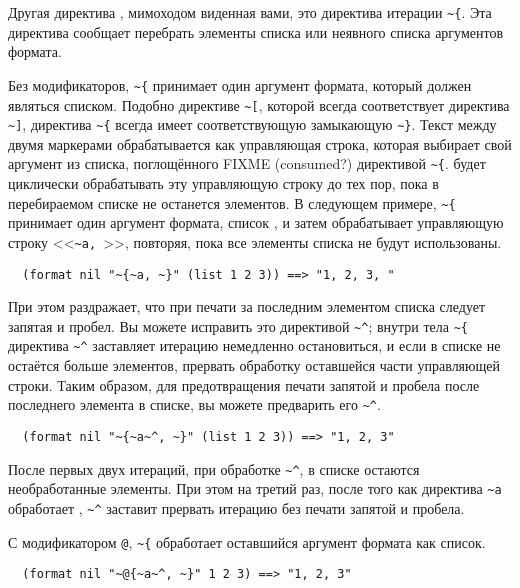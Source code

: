 Другая директива , мимоходом виденная вами, это директива итерации
\lstinline!~{!. Эта директива сообщает  перебрать элементы списка или
  неявного списка аргументов формата.

Без модификаторов, \lstinline!~{! принимает один аргумент формата, который должен являться списком. Подобно директиве
\lstinline!~[!, которой всегда соответствует директива \lstinline!~]!, директива \lstinline!~{! всегда имеет соответствующую замыкающую
\lstinline!~}!. Текст между двумя маркерами обрабатывается как управляющая строка, которая выбирает свой аргумент из
списка, поглощённого FIXME (consumed?)  директивой \lstinline!~{!.  будет циклически обрабатывать эту
управляющую строку до тех пор, пока в перебираемом списке не останется элементов. В следующем примере, \lstinline!~{!
принимает один аргумент формата, список , и затем обрабатывает управляющую строку <<\lstinline!~a, !>>, повторяя,
пока все элементы списка не будут использованы.

\begin{verbatim}
  (format nil "~{~a, ~}" (list 1 2 3)) ==> "1, 2, 3, "
\end{verbatim}

При этом раздражает, что при печати за последним элементом списка следует запятая и пробел. Вы можете исправить
это директивой \lstinline!~^!; внутри тела \lstinline!~{! директива \lstinline!~^! заставляет итерацию немедленно остановиться, и если в
списке не остаётся больше элементов, прервать обработку оставшейся части управляющей строки. Таким образом, для
предотвращения печати запятой и пробела после последнего элемента в списке, вы можете предварить его \lstinline!~^!.

\begin{verbatim}
  (format nil "~{~a~^, ~}" (list 1 2 3)) ==> "1, 2, 3"
\end{verbatim}

После первых двух итераций, при обработке \lstinline!~^!, в списке остаются необработанные
элементы. При этом на третий раз, после того как директива \lstinline!~a! обработает
, \lstinline!~^! заставит  прервать итерацию без печати запятой и
пробела.

С модификатором \lstinline!@!, \lstinline!~{! обработает оставшийся аргумент формата как список.

\begin{verbatim}
  (format nil "~@{~a~^, ~}" 1 2 3) ==> "1, 2, 3"
\end{verbatim}

